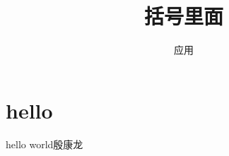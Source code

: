 \documentclass{article}
\title{括号里面}
\author{应用}
\begin{document}
\maketitle

\section{hello}
hello world殷康龙
\end{document}
